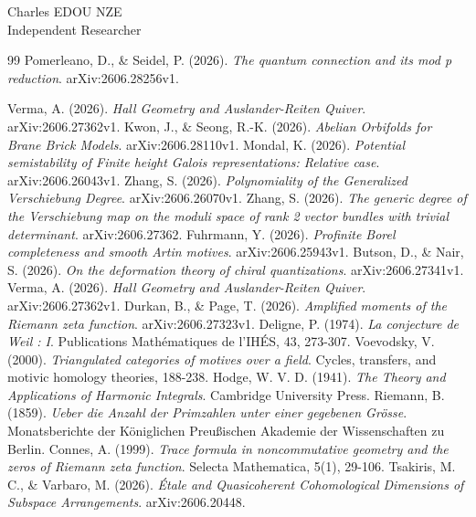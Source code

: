\documentclass[
]{article}
\begin{document}
\vspace{1em}
\begin{flushright}
Charles EDOU NZE \\ \small Independent Researcher
\end{flushright}


\begin{thebibliography}{99}
 Pomerleano, D., \& Seidel, P. (2026). \textit{The quantum connection and its mod p reduction}. arXiv:2606.28256v1.

 Verma, A. (2026). \textit{Hall Geometry and Auslander-Reiten Quiver}. arXiv:2606.27362v1.
 Kwon, J., \& Seong, R.-K. (2026). \textit{Abelian Orbifolds for Brane Brick Models}. arXiv:2606.28110v1.
 Mondal, K. (2026). \textit{Potential semistability of Finite height Galois representations: Relative case}. arXiv:2606.26043v1.
 Zhang, S. (2026). \textit{Polynomiality of the Generalized Verschiebung Degree}. arXiv:2606.26070v1.
 Zhang, S. (2026). \textit{The generic degree of the Verschiebung map on the moduli space of rank 2 vector bundles with trivial determinant}. arXiv:2606.27362.
 Fuhrmann, Y. (2026). \textit{Profinite Borel completeness and smooth Artin motives}. arXiv:2606.25943v1.
 Butson, D., \& Nair, S. (2026). \textit{On the deformation theory of chiral quantizations}. arXiv:2606.27341v1.
 Verma, A. (2026). \textit{Hall Geometry and Auslander-Reiten Quiver}. arXiv:2606.27362v1.
 Durkan, B., \& Page, T. (2026). \textit{Amplified moments of the Riemann zeta function}. arXiv:2606.27323v1.
 Deligne, P. (1974). \textit{La conjecture de Weil : I}. Publications Mathématiques de l'IHÉS, 43, 273-307.
 Voevodsky, V. (2000). \textit{Triangulated categories of motives over a field}. Cycles, transfers, and motivic homology theories, 188-238.
 Hodge, W. V. D. (1941). \textit{The Theory and Applications of Harmonic Integrals}. Cambridge University Press.
 Riemann, B. (1859). \textit{Ueber die Anzahl der Primzahlen unter einer gegebenen Grösse}. Monatsberichte der Königlichen Preußischen Akademie der Wissenschaften zu Berlin.
 Connes, A. (1999). \textit{Trace formula in noncommutative geometry and the zeros of Riemann zeta function}. Selecta Mathematica, 5(1), 29-106.
 Tsakiris, M. C., \& Varbaro, M. (2026). \textit{Étale and Quasicoherent Cohomological Dimensions of Subspace Arrangements}. arXiv:2606.20448.

\end{thebibliography}
\end{document}
